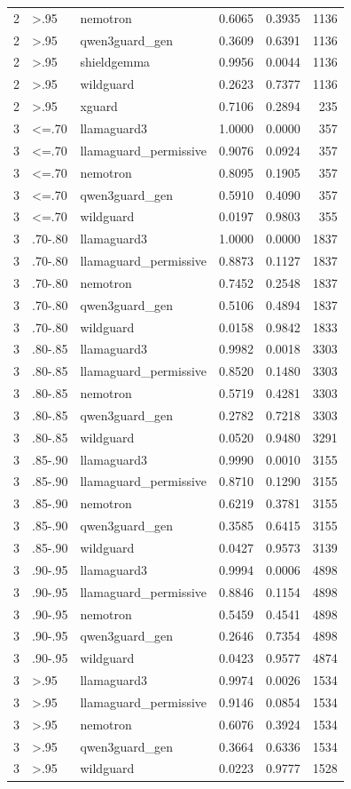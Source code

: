 \begin{tabular}{rllrrr}
2 & >.95 & nemotron & 0.6065 & 0.3935 & 1136 \\
2 & >.95 & qwen3guard\_gen & 0.3609 & 0.6391 & 1136 \\
2 & >.95 & shieldgemma & 0.9956 & 0.0044 & 1136 \\
2 & >.95 & wildguard & 0.2623 & 0.7377 & 1136 \\
2 & >.95 & xguard & 0.7106 & 0.2894 & 235 \\
3 & <=.70 & llamaguard3 & 1.0000 & 0.0000 & 357 \\
3 & <=.70 & llamaguard\_permissive & 0.9076 & 0.0924 & 357 \\
3 & <=.70 & nemotron & 0.8095 & 0.1905 & 357 \\
3 & <=.70 & qwen3guard\_gen & 0.5910 & 0.4090 & 357 \\
3 & <=.70 & wildguard & 0.0197 & 0.9803 & 355 \\
3 & .70-.80 & llamaguard3 & 1.0000 & 0.0000 & 1837 \\
3 & .70-.80 & llamaguard\_permissive & 0.8873 & 0.1127 & 1837 \\
3 & .70-.80 & nemotron & 0.7452 & 0.2548 & 1837 \\
3 & .70-.80 & qwen3guard\_gen & 0.5106 & 0.4894 & 1837 \\
3 & .70-.80 & wildguard & 0.0158 & 0.9842 & 1833 \\
3 & .80-.85 & llamaguard3 & 0.9982 & 0.0018 & 3303 \\
3 & .80-.85 & llamaguard\_permissive & 0.8520 & 0.1480 & 3303 \\
3 & .80-.85 & nemotron & 0.5719 & 0.4281 & 3303 \\
3 & .80-.85 & qwen3guard\_gen & 0.2782 & 0.7218 & 3303 \\
3 & .80-.85 & wildguard & 0.0520 & 0.9480 & 3291 \\
3 & .85-.90 & llamaguard3 & 0.9990 & 0.0010 & 3155 \\
3 & .85-.90 & llamaguard\_permissive & 0.8710 & 0.1290 & 3155 \\
3 & .85-.90 & nemotron & 0.6219 & 0.3781 & 3155 \\
3 & .85-.90 & qwen3guard\_gen & 0.3585 & 0.6415 & 3155 \\
3 & .85-.90 & wildguard & 0.0427 & 0.9573 & 3139 \\
3 & .90-.95 & llamaguard3 & 0.9994 & 0.0006 & 4898 \\
3 & .90-.95 & llamaguard\_permissive & 0.8846 & 0.1154 & 4898 \\
3 & .90-.95 & nemotron & 0.5459 & 0.4541 & 4898 \\
3 & .90-.95 & qwen3guard\_gen & 0.2646 & 0.7354 & 4898 \\
3 & .90-.95 & wildguard & 0.0423 & 0.9577 & 4874 \\
3 & >.95 & llamaguard3 & 0.9974 & 0.0026 & 1534 \\
3 & >.95 & llamaguard\_permissive & 0.9146 & 0.0854 & 1534 \\
3 & >.95 & nemotron & 0.6076 & 0.3924 & 1534 \\
3 & >.95 & qwen3guard\_gen & 0.3664 & 0.6336 & 1534 \\
3 & >.95 & wildguard & 0.0223 & 0.9777 & 1528 \\
\bottomrule
\end{tabular}
